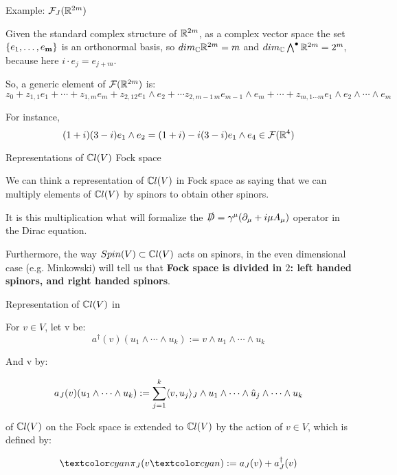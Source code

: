 \begin{frame}{Example: $\mathcal F_J(\mathbb R^{2m})$} %
    
    Given the standard complex structure of $\mathbb R^{2m}$, as a complex vector space the set $\{e_1, \dots, e_{\textbf{m}}\}$ is an orthonormal basis, so $dim_\mathbb C\mathbb R^{2m} = m$ and $dim_\mathbb C \bigwedge^\bullet \mathbb R^{2m} = 2^m$, because here $i\cdot e_j = e_{j+m}$.
    
    So, a generic element of $\mathcal F(\mathbb R^{2m})$ is: \quad $z_0 + z_{1,1}e_1 + \cdots + z_{1,m} e_m + z_{2, 12} e_1\wedge e_2 + \cdots z_{2, m-1\, m} e_{m-1} \wedge e_{m} + \cdots + z_{m, 1\cdots m} e_1 \wedge e_2 \wedge \cdots \wedge e_m $
    
    For instance, \[(1+i) (3-i)e_1 \wedge e_2 = (1+i) - i(3-i) e_1 \wedge e_4 \in \mathcal F(\mathbb R^4)\]
    
\end{frame}

\begin{frame}{Representations of $\mathbb C l(V)$ \Iff Fock space}

    We can think a representation of $\mathbb C l(V)$ in Fock space as saying that we can multiply elements of $\mathbb C l(V)$ by spinors to obtain other spinors. 
    
    It is this multiplication what will formalize the $\slashed D = \gamma^\mu ( \partial_\mu + i \mu A_\mu)$ operator in the Dirac equation.
    
    Furthermore, the way $Spin(V) \subset \mathbb C l(V)$ acts on spinors, in the even dimensional case (e.g. Minkowski) will tell us that \textbf{Fock space is divided in $2$: left handed spinors, and right handed spinors}.
    
\end{frame}

\begin{frame}{Representation of $\mathbb C l(V)$ in \fjv} %
    
    For $v \in V$, let v be:
    \[ a^\dagger(v) (u_1 \wedge \cdots \wedge u_k) := v \wedge u_1 \wedge \cdots \wedge u_k \]
    
    And v by:
    
    \[ a_J(v) (u_1 \wedge \cdots \wedge u_k) := \sum_{j = 1}^k \langle v, u_j \rangle_J \wedge u_1 \wedge \cdots \wedge \hat u_j \wedge \cdots  \wedge u_k \]
    
     of $\mathbb C l(V)$ on the Fock space is extended to $\mathbb C l(V)$ by the action of $v \in V$, which is defined by:
    
    \[ \defn{\pi_J(}v\defn{)} := a_J(v) + a_J^\dagger(v) \]
\end{frame}

